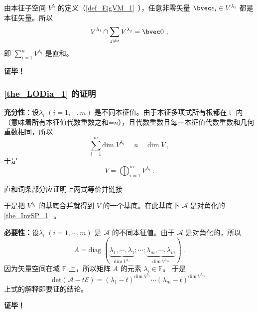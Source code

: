 由本征子空间 $V^\lambda$ 的定义（\autoref{def_EigVM_1}~），任意非零矢量 $\bvec e_i\in V^{\lambda _i}$ 都是本征矢量。所以
\begin{equation}
V^{\lambda_i}\cap\sum_{j\neq i}V^{\lambda_j}=\bvec 0~,
\end{equation}
即  $\sum\limits_{i=1}^nV^{\lambda_i}$ 是直和。

\textbf{证毕！}
\subsubsection{\autoref{the_LODia_1} 的证明}
\textbf{充分性}：设$\lambda_i\;(i=1,\cdots, m)$ 是不同本征值。由于本征多项式所有根都在 $\mathbb{F}$ 内（意味着所有本征值代数重数之和=$n$），且代数重数且每一本征值代数重数和几何重数相同，所以
\begin{equation}
\sum_{i=1}^m \mathrm{dim}\;V^{\lambda_i}=n=\mathrm{dim}\; V~,
\end{equation}
于是
\begin{equation}
V=\bigoplus_{i=1}^m V^{\lambda_i}~.
\end{equation}
\begin{issues}
直和词条部分应证明上两式等价并链接
\end{issues}
于是把 $V^{\lambda_i}$ 的基底合并就得到 $V$ 的一个基底。在此基底下 $\mathcal{A}$ 是对角化的\autoref{the_InvSP_1}~。

\textbf{必要性：}设$\lambda_i\;(i=1,\cdots, m)$ 是 $\mathcal A$ 的不同本征值。由于 $\mathcal A$ 是对角化的，所以
\begin{equation}
A=\mathrm{diag}\;(\underbrace{\lambda_1,\cdots,\lambda_1}_{\mathrm{dim}\;V^{\lambda_1}};\cdots;\underbrace{\lambda_m,\cdots,\lambda_m}_{\mathrm{dim}\;V^{\lambda_m}})~.
\end{equation}
因为矢量空间在域 $\mathbb{F}$ 上，所以矩阵 $A$ 的元素 $\lambda_i\in \mathbb{F}$。
于是
\begin{equation}
\mathrm{det}(\mathcal{A}-t\mathcal E)=(\lambda_1-t)^{\mathrm{dim}\;V^{\lambda_1}}\cdots(\lambda_m-t)^{\mathrm{dim}\;V^{\lambda_m}}~
\end{equation}
上式的解释即要证的结论。

\textbf{证毕！}